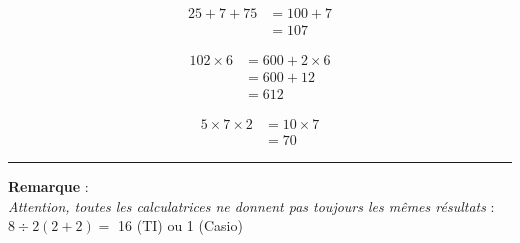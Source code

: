 \documentclass[11pt]{article}
\newcommand{\horrule}[1]{\rule{\linewidth}{#1}} %
\begin{document}
\begin{minipage}[t]{0.33\textwidth}
\begin{align*}
25 + 7 + 75 &= 100 + 7  \\
            &= 107
\end{align*}

\end{minipage}
\begin{minipage}[t]{0.33\textwidth}

\begin{align*}
102 \times 6 &= 600 + 2 \times 6 \\
             &= 600 + 12 \\
             &= 612
\end{align*}

\end{minipage}
\begin{minipage}[t]{0.33\textwidth}

\begin{align*}
5 \times 7 \times 2 &= 10 \times 7 \\
                    &= 70
\end{align*}
\end{minipage}

\vspace{0.5cm}\horrule{1px}\vspace{0.5cm}

\textbf{Remarque} : \\
\textit{Attention, toutes les calculatrices ne donnent pas toujours les mêmes résultats} : $8 \div 2(2+2) =$ 16 (TI) ou 1 (Casio)
\end{document}
